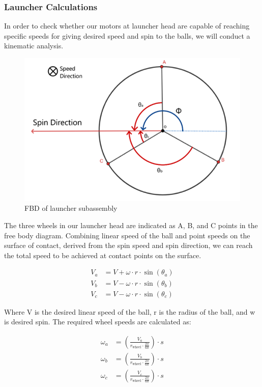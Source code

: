 \documentclass[12pt]{report}
\begin{document}
\subsubsection{Launcher Calculations}

In order to check whether our motors at launcher head are capable of reaching specific speeds for giving desired speed and spin to the balls, we will conduct a kinematic analysis.

\begin{figure}[h!]
    \centering
    \includegraphics[width=0.4\linewidth]{3.1.1.png}
    \caption{FBD of launcher subassembly}
    \label{fig:enter-label}
\end{figure}

The three wheels in our launcher head are indicated as A, B, and C points in the free body diagram.  Combining linear speed of the ball and point speeds on the surface of contact, derived from the spin speed and spin direction, we can reach the total speed to be achieved at contact points on the surface.

\begin{align}
    V_a &= V + \omega \cdot r \cdot \sin(\theta_a) \\[-0.5pt]
    V_b &= V - \omega \cdot r \cdot \sin(\theta_b) \\[-0.5pt]
    V_c &= V - \omega \cdot r \cdot \sin(\theta_c)
\end{align}

Where V is the desired linear speed of the ball, r is the radius of the ball, and w is desired spin.
The required wheel speeds are calculated as:

\begin{align}
    \omega_a &= \left( \frac{V_a}{r_{\text{wheel}} \cdot \frac{2\pi}{60}} \right) \cdot s \\[-0.5pt]
    \omega_b &= \left( \frac{V_b}{r_{\text{wheel}} \cdot \frac{2\pi}{60}} \right) \cdot s \\[-0.5pt]
    \omega_c &= \left( \frac{V_c}{r_{\text{wheel}} \cdot \frac{2\pi}{60}} \right) \cdot s
\end{align}
\end{document}
